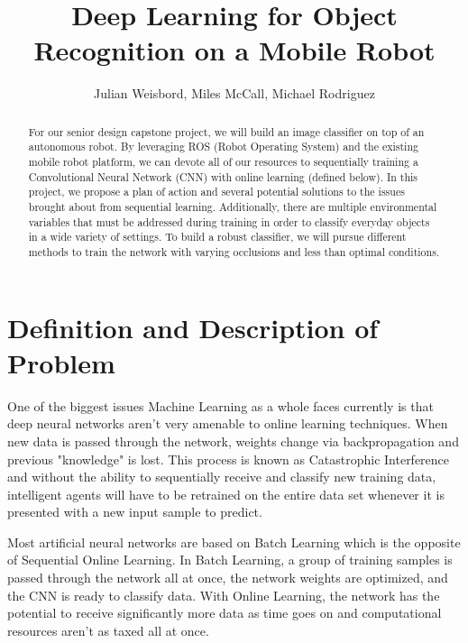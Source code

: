 \documentclass[a4paper]{article}
\title{Deep Learning for Object Recognition on a Mobile Robot}
\author{Julian Weisbord, Miles McCall, Michael Rodriguez}
\begin{document}
\maketitle

\begin{abstract}
For our senior design capstone project, we will build an image classifier on top of an autonomous robot. By leveraging ROS (Robot Operating System) and the existing mobile robot platform, we can devote all of our resources to sequentially training a Convolutional Neural Network (CNN) with online learning (defined below). In this project, we propose a plan of action and several potential solutions to the issues brought about from sequential learning. Additionally, there are multiple environmental variables that must be addressed during training in order to classify everyday objects in a wide variety of settings. To build a robust classifier, we will pursue different methods to train the network with varying occlusions and less than optimal conditions.
\end{abstract}

\newpage

\section{Definition and Description of Problem}

One of the biggest issues Machine Learning as a whole faces currently is that deep neural networks aren't very amenable to online learning techniques. When new data is passed through the network, weights change via backpropagation and previous "knowledge" is lost. This process is known as Catastrophic Interference and without the ability to sequentially receive and classify new training data, intelligent agents will have to be retrained on the entire data set whenever it is presented with a new input sample to predict.

Most artificial neural networks are based on Batch Learning which is the opposite of Sequential Online Learning. In Batch Learning, a group of training samples is passed through the network all at once, the network weights are optimized, and the CNN is ready to classify data. With Online Learning, the network has the potential to receive significantly more data as time goes on and computational resources aren't as taxed all at once.
\end{document}
